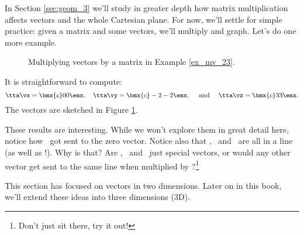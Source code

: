 In Section \ref{sec:geom_3} we'll study in greater depth how matrix multiplication affects vectors and the whole Cartesian plane. For now, we'll settle for simple practice: given a matrix and some vectors, we'll multiply and graph. Let's do one more example.\\


{\begin{figure}[h!]
\begin{center}
\end{center}
\caption{Multiplying vectors by a matrix in Example \ref{ex_mv_23}.}
\label{fig:mv_23}
\end{figure}

It is straightforward to compute: $$\tta\vx = \bmx{c} 0\\0\emx,\quad \tta\vy = \bmx{c} -2\\-2\emx, \quad \text{ and } \quad \tta\vz = \bmx{c} 3\\3\emx.$$ The vectors are sketched in Figure \ref{fig:mv_23}.

These results are interesting. While we won't explore them in great detail here, notice how \vx\ got sent to the zero vector. Notice also that \tta\vx, \tta\vy\ and \tta\vz\ are all in a line (as well as \vx!). Why is that? Are \vx, \vy\ and \vz\ just special vectors, or would any other vector get sent to the same line when multiplied by \tta?\footnote{Don't just sit there, try it out!}
}


This section has focused on vectors in two dimensions. Later on in this book, we'll extend these ideas into three dimensions (3D). 
%

